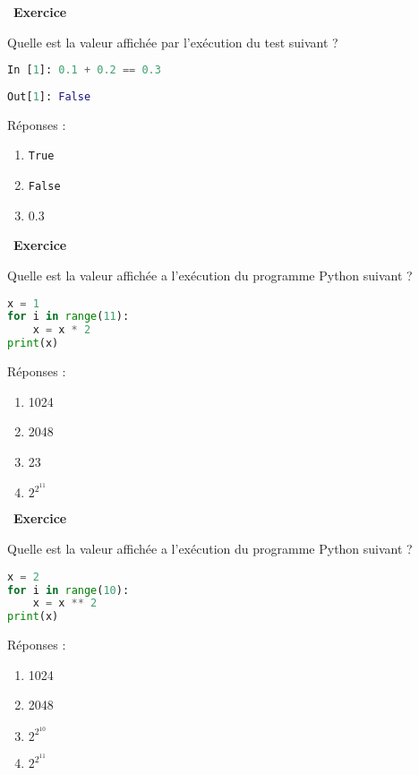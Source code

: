 \documentclass[
  11pt,
]{article}
\newcommand{\passthrough}[1]{#1}
\providecommand{\tightlist}{%
  \setlength{\itemsep}{0pt}\setlength{\parskip}{0pt}}
\newcounter{exo}
\newenvironment{exercice}[1]
{\par \medskip   \addtocounter{exo}{1} \noindent  
\begin{bclogo}[arrondi =0.1,   noborder = true, logo=\bccrayon, marge=4]{~\textbf{Exercice} \textbf{\theexo} {\itshape #1} }  \par}
{
\end{bclogo}
 \par \bigskip }
\newcounter{def}
\newcounter{prog}
\begin{document}
\begin{exercice}{}

Quelle est la valeur affichée par l'exécution du test suivant ?

\begin{lstlisting}[language=Python]
In [1]: 0.1 + 0.2 == 0.3              
                                                                                                                                                                         
Out[1]: False
\end{lstlisting}

Réponses :

\begin{enumerate}
\def\labelenumi{\arabic{enumi}.}
\tightlist
\item
  \passthrough{\lstinline!True!}
\item
  \passthrough{\lstinline!False!}
\item
  0.3
\end{enumerate}

\end{exercice}

\begin{exercice}{}

Quelle est la valeur affichée a l'exécution du programme Python suivant
?

\begin{lstlisting}[language=Python]
x = 1 
for i in range(11): 
    x = x * 2 
print(x)
\end{lstlisting}

Réponses :

\begin{enumerate}
\def\labelenumi{\arabic{enumi}.}
\tightlist
\item
  1024
\item
  2048
\item
  23
\item
  \(2^{2^{11}}\)
\end{enumerate}

\end{exercice}

\begin{exercice}{}

Quelle est la valeur affichée a l'exécution du programme Python suivant
?

\begin{lstlisting}[language=Python]
x = 2 
for i in range(10): 
    x = x ** 2 
print(x)
\end{lstlisting}

Réponses :

\begin{enumerate}
\def\labelenumi{\arabic{enumi}.}
\tightlist
\item
  1024
\item
  2048
\item
  \(2^{2^{10}}\)
\item
  \(2^{2^{11}}\)
\end{enumerate}

\end{exercice}
\end{document}
